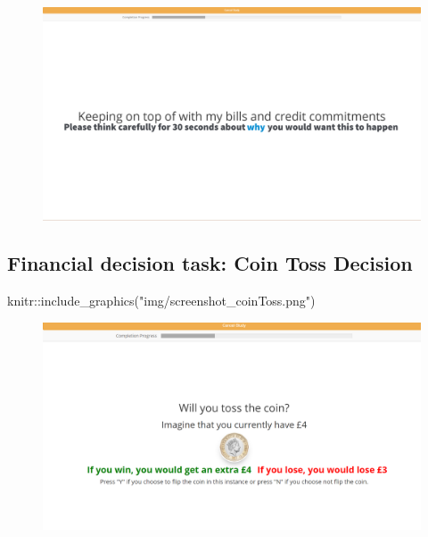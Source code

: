\documentclass[
  letterpaper,
  DIV=11,
  numbers=noendperiod]{scrartcl}
\newenvironment{Shaded}{\begin{snugshade}}{\end{snugshade}}
\newcommand{\FunctionTok}[1]{\textcolor[rgb]{0.28,0.35,0.67}{#1}}
\newcommand{\NormalTok}[1]{\textcolor[rgb]{0.00,0.23,0.31}{#1}}
\newcommand{\SpecialCharTok}[1]{\textcolor[rgb]{0.37,0.37,0.37}{#1}}
\newcommand{\StringTok}[1]{\textcolor[rgb]{0.13,0.47,0.30}{#1}}
\begin{document}
\begin{figure}[H]

{\centering \includegraphics[width=2\textwidth,height=\textheight]{img/construal_cue_high.png}

}

\end{figure}

\hypertarget{financial-decision-task-coin-toss-decision}{%
\subsection{Financial decision task: Coin Toss
Decision}\label{financial-decision-task-coin-toss-decision}}

\begin{Shaded}
\begin{Highlighting}[]
\NormalTok{knitr}\SpecialCharTok{::}\FunctionTok{include\_graphics}\NormalTok{(}\StringTok{"img/screenshot\_coinToss.png"}\NormalTok{)}
\end{Highlighting}
\end{Shaded}

\begin{figure}[H]

{\centering \includegraphics[width=1\textwidth,height=\textheight]{img/screenshot_coinToss.png}

}

\end{figure}
\end{document}
